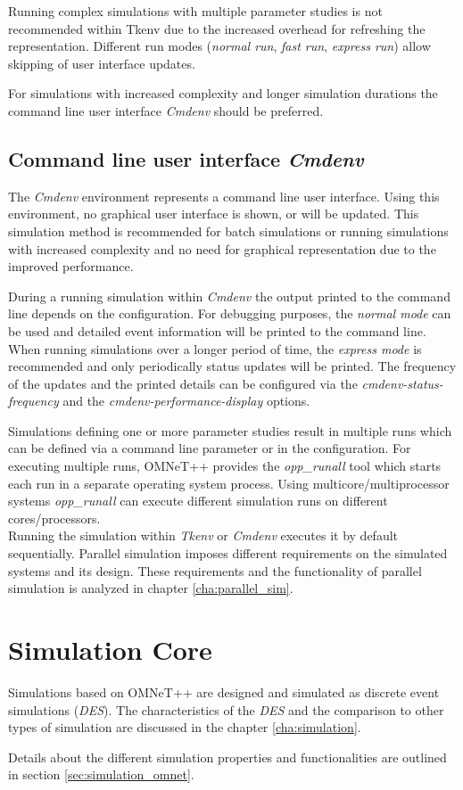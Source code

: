 Running complex simulations with multiple parameter studies is not recommended within Tkenv due to the increased overhead for refreshing the representation.
Different run modes (\emph{normal run}, \emph{fast run}, \emph{express run}) allow skipping of user interface updates. \cite[section 7.3.2]{omnet_user_guide}

For simulations with increased complexity and longer simulation durations the command line user interface \emph{Cmdenv} should be preferred.

\subsection{Command line user interface \emph{Cmdenv}}
\label{sec:omnet_running_cmdenv}
The \emph{Cmdenv} environment represents a command line user interface.
Using this environment, no graphical user interface is shown, or will be updated.
This simulation method is recommended for batch simulations or running simulations with increased complexity and no need for graphical representation due to the improved performance.

During a running simulation within \emph{Cmdenv} the output printed to the command line depends on the configuration.
For debugging purposes, the \emph{normal mode} can be used and detailed event information will be printed to the command line.
When running simulations over a longer period of time, the \emph{express mode} is recommended and only periodically status updates will be printed.
The frequency of the updates and the printed details can be configured via the \emph{cmdenv-status-frequency} and the \emph{cmdenv-performance-display} options. \cite[section 10.2.3]{omnet_manual}

Simulations defining one or more parameter studies result in multiple runs which can be defined via a command line parameter or in the configuration.
For executing multiple runs, OMNeT++ provides the \emph{opp\_runall} tool which starts each run in a separate operating system process.
Using multicore/multiprocessor systems \emph{opp\_runall} can execute different simulation runs on different cores/processors. \cite[section 10.4.3]{omnet_manual}
\\

Running the simulation within \emph{Tkenv} or \emph{Cmdenv} executes it by default sequentially.
Parallel simulation imposes different requirements on the simulated systems and its design.
These requirements and the functionality of parallel simulation is analyzed in chapter \ref{cha:parallel_sim}.

\section{Simulation Core}
Simulations based on OMNeT++ are designed and simulated as discrete event simulations (\emph{DES}).
The characteristics of the \emph{DES} and the comparison to other types of simulation are discussed in the chapter \ref{cha:simulation}.

Details about the different simulation properties and functionalities are outlined in section \ref{sec:simulation_omnet}.
